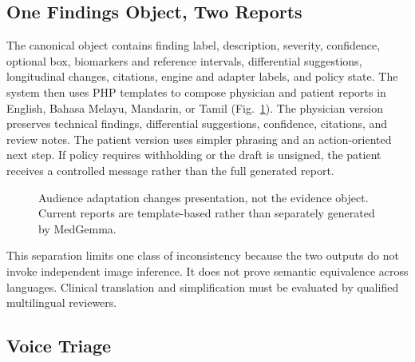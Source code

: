 \documentclass[conference]{IEEEtran}
\begin{document}
\subsection{One Findings Object, Two Reports}

The canonical object contains finding label, description, severity, confidence, optional box, biomarkers and reference intervals, differential suggestions, longitudinal changes, citations, engine and adapter labels, and policy state. The system then uses PHP templates to compose physician and patient reports in English, Bahasa Melayu, Mandarin, or Tamil (Fig.~\ref{fig:dualreport}). The physician version preserves technical findings, differential suggestions, confidence, citations, and review notes. The patient version uses simpler phrasing and an action-oriented next step. If policy requires withholding or the draft is unsigned, the patient receives a controlled message rather than the full generated report.

\begin{figure}[t]
\centering
{}
\caption{Audience adaptation changes presentation, not the evidence object. Current reports are template-based rather than separately generated by MedGemma.}
\label{fig:dualreport}
\end{figure}

This separation limits one class of inconsistency because the two outputs do not invoke independent image inference. It does not prove semantic equivalence across languages. Clinical translation and simplification must be evaluated by qualified multilingual reviewers.

\subsection{Voice Triage}
\end{document}
